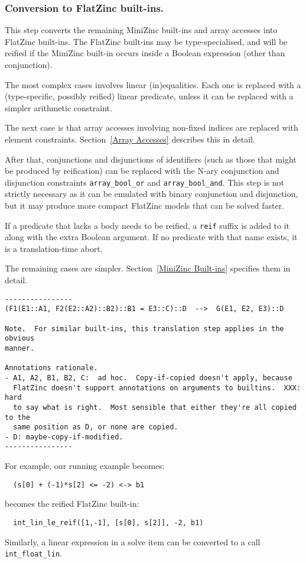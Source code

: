 \documentclass[10pt]{article}
\newcommand{\n}{\symbol{95}}
\begin{document}
\subsubsection{Conversion to FlatZinc built-ins.}
This step converts the remaining MiniZinc built-ins and array accesses
into FlatZinc built-ins.  The FlatZinc built-ins may be type-specialised,
and will be reified if the MiniZinc built-in occurs inside a Boolean
expression (other than conjunction).

The most complex cases involves linear (in)equalities.  Each one
is replaced with a (type-specific, possibly reified) linear predicate,
unless it can be replaced with a simpler arithmetic constraint.

The next case is that array accesses involving non-fixed indices are
replaced with element constraints.  Section~\ref{Array Accesses} describes
this in detail.

After that, conjunctions and disjunctions of identifiers (such as those that
might be produced by reification) can be replaced with the N-ary conjunction
and disjunction constraints \verb+array_bool_or+ and \verb+array_bool_and+.
This step is not strictly necessary as it can be emulated with binary
conjunction and disjunction, but it may produce more compact FlatZinc models
that can be solved faster.

If a predicate that lacks a body needs to be reified, a \texttt{\n{}reif}
suffix is added to it along with the extra Boolean argument.  If no
predicate with that name exists, it is a translation-time abort.

The remaining cases are simpler.  Section~\ref{MiniZinc Built-ins} specifies
them in detail.

\begin{verbatim}
----------------
(F1(E1::A1, F2(E2::A2)::B2)::B1 = E3::C)::D  -->  G(E1, E2, E3)::D

Note.  For similar built-ins, this translation step applies in the obvious
manner.

Annotations rationale.
- A1, A2, B1, B2, C:  ad hoc.  Copy-if-copied doesn't apply, because
  FlatZinc doesn't support annotations on arguments to builtins.  XXX: hard
  to say what is right.  Most sensible that either they're all copied to the
  same position as D, or none are copied.
- D: maybe-copy-if-modified.
----------------
\end{verbatim}

For example, our running example becomes:
\begin{verbatim}
  (s[0] + (-1)*s[2] <= -2) <-> b1
\end{verbatim}
becomes the reified FlatZinc built-in:
\begin{verbatim}
  int_lin_le_reif([1,-1], [s[0], s[2]], -2, b1)
\end{verbatim}
Similarly, a linear expression in a solve item can be converted to a call
\verb+int_float_lin+.
\end{document}
